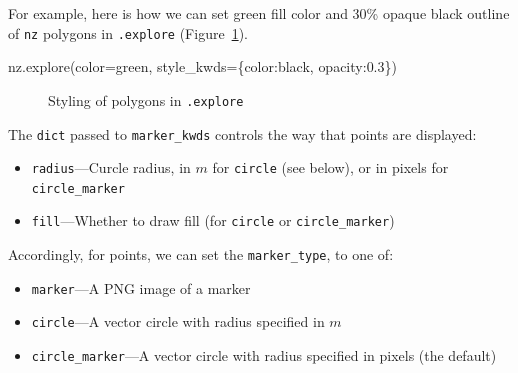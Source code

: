 \documentclass[
  letterpaper,
]{krantz}
\newenvironment{Shaded}{\begin{snugshade}}{\end{snugshade}}
\newcommand{\FloatTok}[1]{\textcolor[rgb]{0.68,0.00,0.00}{#1}}
\newcommand{\NormalTok}[1]{\textcolor[rgb]{0.00,0.23,0.31}{#1}}
\newcommand{\OperatorTok}[1]{\textcolor[rgb]{0.37,0.37,0.37}{#1}}
\newcommand{\StringTok}[1]{\textcolor[rgb]{0.13,0.47,0.30}{#1}}
\providecommand{\tightlist}{%
  \setlength{\itemsep}{0pt}\setlength{\parskip}{0pt}}\usepackage{longtable,booktabs,array}
\begin{document}
For example, here is how we can set green fill color and 30\% opaque
black outline of \texttt{nz} polygons in \texttt{.explore}
(Figure~\ref{fig-explore-styling-polygons}).

\begin{Shaded}
\begin{Highlighting}[]
\NormalTok{nz.explore(color}\OperatorTok{=}\StringTok{\textquotesingle{}green\textquotesingle{}}\NormalTok{, style\_kwds}\OperatorTok{=}\NormalTok{\{}\StringTok{\textquotesingle{}color\textquotesingle{}}\NormalTok{:}\StringTok{\textquotesingle{}black\textquotesingle{}}\NormalTok{, }\StringTok{\textquotesingle{}opacity\textquotesingle{}}\NormalTok{:}\FloatTok{0.3}\NormalTok{\})}
\end{Highlighting}
\end{Shaded}

\begin{figure}


\caption{\label{fig-explore-styling-polygons}Styling of polygons in
\texttt{.explore}}

\end{figure}%

The \texttt{dict} passed to \texttt{marker\_kwds} controls the way that
points are displayed:

\begin{itemize}
\tightlist
\item
  \texttt{radius}---Curcle radius, in \(m\) for \texttt{circle} (see
  below), or in pixels for \texttt{circle\_marker}
\item
  \texttt{fill}---Whether to draw fill (for \texttt{circle} or
  \texttt{circle\_marker})
\end{itemize}

Accordingly, for points, we can set the \texttt{marker\_type}, to one
of:

\begin{itemize}
\tightlist
\item
  \texttt{\textquotesingle{}marker\textquotesingle{}}---A PNG image of a
  marker
\item
  \texttt{\textquotesingle{}circle\textquotesingle{}}---A vector circle
  with radius specified in \(m\)
\item
  \texttt{\textquotesingle{}circle\_marker\textquotesingle{}}---A vector
  circle with radius specified in pixels (the default)
\end{itemize}
\end{document}
